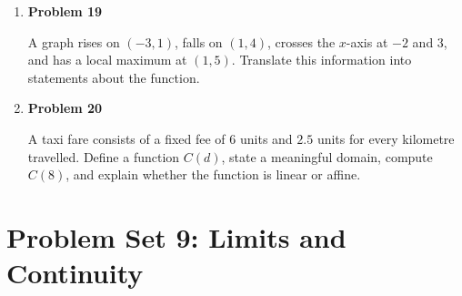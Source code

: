 \begin{enumerate}
\item \textbf{Problem 19}\par
A graph rises on \((-3,1)\), falls on \((1,4)\), crosses the \(x\)-axis at \(-2\) and \(3\), and has a local maximum at \((1,5)\). Translate this information into statements about the function.

\item \textbf{Problem 20}\par
A taxi fare consists of a fixed fee of \(6\) units and \(2.5\) units for every kilometre travelled. Define a function \(C(d)\), state a meaningful domain, compute \(C(8)\), and explain whether the function is linear or affine.
\end{enumerate}

\section{Problem Set 9: Limits and Continuity}

